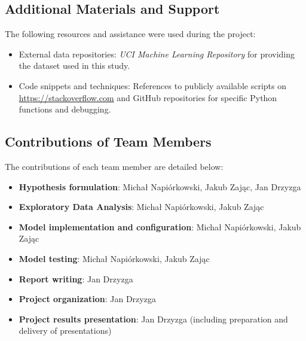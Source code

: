 \documentclass{article}
\begin{document}
\subsection{Additional Materials and Support}
The following resources and assistance were used during the project:
\begin{itemize}
    \item External data repositories: \textit{UCI Machine Learning Repository} for providing the dataset used in this study.
    \item Code snippets and techniques: References to publicly available scripts on \url{https://stackoverflow.com} and GitHub repositories for specific Python functions and debugging.
\end{itemize}

\subsection{Contributions of Team Members}
The contributions of each team member are detailed below:
\begin{itemize}
    \item \textbf{Hypothesis formulation}: Michał Napiórkowski, Jakub Zając, Jan Drzyzga
    \item \textbf{Exploratory Data Analysis}: Michał Napiórkowski, Jakub Zając
    \item \textbf{Model implementation and configuration}: Michał Napiórkowski, Jakub Zając
    \item \textbf{Model testing}: Michał Napiórkowski, Jakub Zając
    \item \textbf{Report writing}: Jan Drzyzga
    \item \textbf{Project organization}: Jan Drzyzga
    \item \textbf{Project results presentation}: Jan Drzyzga (including preparation and delivery of presentations)
\end{itemize}


\newpage
\end{document}
